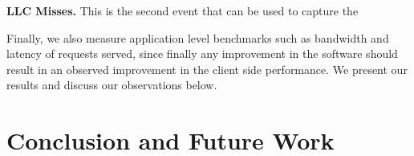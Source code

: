 \documentclass[sigconf]{acmart}
\begin{document}
\textbf{LLC Misses.} This is the second event that can be used to capture the 

Finally, we also measure application level benchmarks such as bandwidth and
latency of requests served, since finally any improvement in the software should
result in an observed improvement in the client side performance. We present our
results and discuss our observations below.

\section{Conclusion and Future Work}

%
%
%
%
\end{document}
